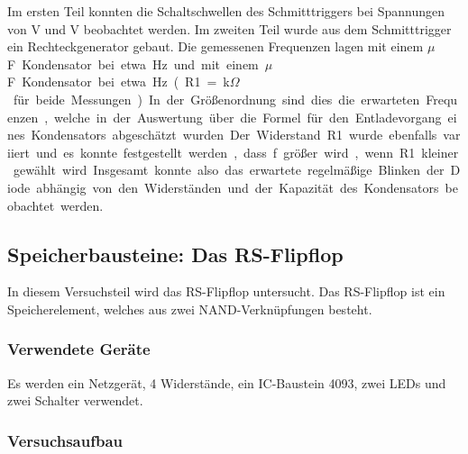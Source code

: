 \documentclass[12pt,a4paper]{article}
\begin{document}
Im ersten Teil konnten die Schaltschwellen des Schmitttriggers bei Spannungen von \unit[2,3]{V} und \unit[3]{V} beobachtet werden.
Im zweiten Teil wurde aus dem Schmitttrigger ein Rechteckgenerator gebaut. Die gemessenen Frequenzen lagen mit einem \unit[10]{$\mu$F} Kondensator bei etwa \unit[1,8]{Hz} und mit einem \unit[100]{$\mu$F} Kondensator bei etwa \unit[0,18]{Hz} (R1 = \unit[81,6]{k$\Omega$} für beide Messungen). In der Größenordnung sind dies die erwarteten Frequenzen, welche in der Auswertung über die Formel für den Entladevorgang eines Kondensators abgeschätzt wurden. Der Widerstand R1 wurde ebenfalls variiert und es konnte festgestellt werden, dass f größer wird, wenn R1 kleiner gewählt wird. Insgesamt konnte also das erwartete regelmäßige Blinken der Diode abhängig von den Widerständen und der Kapazität des Kondensators beobachtet werden.

\subsection{Speicherbausteine: Das RS-Flipflop}

In diesem Versuchsteil wird das RS-Flipflop untersucht. Das RS-Flipflop ist ein Speicherelement, welches aus zwei NAND-Verknüpfungen besteht.

\subsubsection*{Verwendete Geräte}
Es werden ein Netzgerät, 4 Widerstände, ein IC-Baustein 4093, zwei LEDs und zwei Schalter verwendet.
\subsubsection*{Versuchsaufbau}
\end{document}
